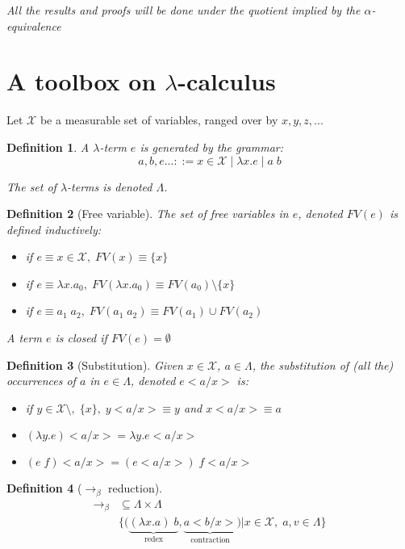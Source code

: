 \documentclass{article}
\newtheorem{defi}{Definition}
\begin{document}
\emph{All the results and proofs will be done under the quotient implied by the $\alpha$-equivalence}
\section{A toolbox on $\lambda$-calculus}
Let $\mathcal{X}$ be a measurable set of variables, ranged over by $x,y,z,...$

\begin{defi}
A $\lambda$-term $e$ is generated by the grammar:
\[ a,b,e ... ::= x\in \mathcal{X} \;|\; \lambda x.e \; | \; a \; b\]

The set of $\lambda$-terms is denoted $\Lambda$.
\end{defi}


\begin{defi}[Free variable]
The set of free variables in $e$, denoted $FV(e)$ is defined inductively:
\begin{itemize}
\item if $e\equiv x\in \mathcal{X},\; FV(x)\equiv\{x\}$
\item if $e\equiv \lambda x . a_0, \; FV(\lambda x.a_0) \equiv FV(a_0)\setminus \{x\}$
\item if $e\equiv a_1 \; a_2, \; FV(a_1\;a_2)\equiv FV(a_1) \cup FV(a_2)$
\end{itemize}
A term $e$ is \emph{closed} if $FV(e)=\emptyset$
\end{defi}

\begin{defi}[Substitution]
Given $x \in \mathcal{X}$, $a\in \Lambda$, the substitution of (all the) occurrences of $a$ in $e\in \Lambda$, denoted $e<a/x>$ is:
\begin{itemize}
\item if $y\in \mathcal{X} \setminus,\; \{x\}, \; y<a/x>\equiv y $ and $x<a/x>\equiv a$
\item $(\lambda y.e)<a/x> = \lambda y.e<a/x>$
\item $(e\; f)<a/x> = (e<a/x>)\; f<a/x> $
\end{itemize}
\end{defi}

\begin{defi}[$\to_\beta$ reduction]
\begin{align*}
\to_\beta & \subseteq \Lambda \times \Lambda\\
& \Big\{ \big( \underbrace{(\lambda x.a)\; b}_{\text{redex}},\underbrace{a<b/x>}_{\text{contraction}}\big)\big| x\in \mathcal{X},\; a,v \in \Lambda \Big\}
\end{align*}
\end{defi}
\end{document}

